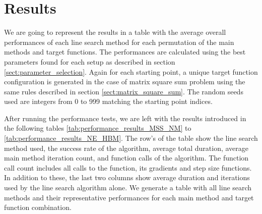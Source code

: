 \documentclass[a4paper,english,titlepage,12pt]{article}
\begin{document}


\section{Results}


We are going to represent the results in a table with the average overall performances of each line search method for each permutation of the main methods and target functions. The performances are calculated using the best parameters found for each setup as described in section \ref{sect:parameter_selection}. Again for each starting point, a unique target function configuration is generated in the case of matrix square sum problem using the same rules described in section \ref{sect:matrix_square_sum}. The random seeds used are integers from 0 to 999 matching the starting point indices.

After running the performance tests, we are left with the results introduced in the following tables \ref{tab:performance_results_MSS_NM} to \ref{tab:performance_results_NE_HBM}. The row's of the table show the line search method used, the success rate of the algorithm, average total duration, average main method iteration count, and function calls of the algorithm. The function call count includes all calls to the function, its gradients and step size functions. In addition to these, the last two columns show average duration and iterations used by the line search algorithm alone. We generate a table with all line search methods and their representative performances for each main method and target function combination.
\end{document}
